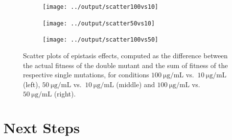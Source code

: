 \documentclass[12pt]{article}
\begin{document}
  \begin{figure}[ht]
    \begin{subfigure}{.33\textwidth}
      \centering
      \texttt{[image: ../output/scatter100vs10]}
    \end{subfigure}
    \begin{subfigure}{.33\textwidth}
      \centering
      \texttt{[image: ../output/scatter50vs10]}
    \end{subfigure}
    \begin{subfigure}{.33\textwidth}
      \centering
      \texttt{[image: ../output/scatter100vs50]}
    \end{subfigure}
    \caption{Scatter plots of epistasis effects, computed as the difference
    between the actual fitness of the double mutant and the sum of fitness of
    the respective single mutations, for conditions
    $\SI{100}{\micro\gram\per\milli\liter}$ vs.\
    $\SI{10}{\micro\gram\per\milli\liter}$ (left),
    $\SI{50}{\micro\gram\per\milli\liter}$ vs.\
    $\SI{10}{\micro\gram\per\milli\liter}$ (middle) and
    $\SI{100}{\micro\gram\per\milli\liter}$ vs.\
    $\SI{50}{\micro\gram\per\milli\liter}$ (right).}%
    \label{fig:epicompare}
  \end{figure}

  \section{Next Steps}



  \newpage

  
  
\end{document}
